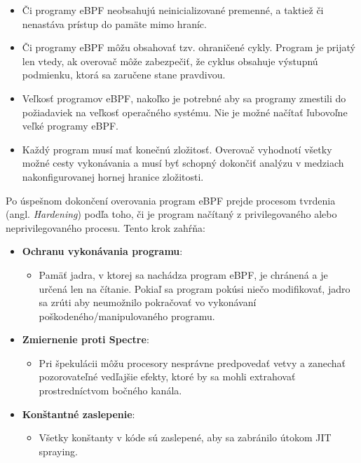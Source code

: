 \begin{itemize}
    \item Či programy eBPF neobsahujú neinicializované premenné, a taktiež či nenastáva prístup do pamäte mimo hraníc.
    \item Či programy eBPF môžu obsahovať tzv. ohraničené cykly. Program je prijatý len vtedy, ak overovač môže zabezpečiť, 
    že cyklus obsahuje výstupnú podmienku, ktorá sa zaručene stane pravdivou.
    \item Veľkosť programov eBPF, nakoľko je potrebné aby sa programy zmestili do požiadaviek na veľkosť operačného systému. 
    Nie je možné načítať ľubovoľne veľké programy eBPF.
    \item Každý program musí mať konečnú zložitosť. Overovač vyhodnotí všetky možné cesty vykonávania a musí byť schopný dokončiť analýzu 
    v medziach nakonfigurovanej hornej hranice zložitosti.
\end{itemize}

Po úspešnom dokončení overovania program eBPF prejde procesom tvrdenia (angl. \emph{Hardening}) podľa toho, či je program načítaný z 
privilegovaného alebo neprivilegovaného procesu. 
Tento krok zahŕňa:
\begin{itemize}
    \item \textbf{Ochranu vykonávania programu}: 
        \begin{itemize}
            \item Pamäť jadra, v ktorej sa nachádza program eBPF, je chránená a je určená len na čítanie. 
            Pokiaľ sa program pokúsi niečo modifikovať, jadro sa zrúti aby neumožnilo pokračovať vo vykonávaní poškodeného/manipulovaného programu.
        \end{itemize}
    \item \textbf{Zmiernenie proti Spectre}: 
        \begin{itemize}
            \item Pri špekulácii môžu procesory nesprávne predpovedať vetvy a zanechať pozorovateľné vedľajšie efekty, 
            ktoré by sa mohli extrahovať prostredníctvom bočného kanála.
        \end{itemize}
    \item \textbf{Konštantné zaslepenie}: 
        \begin{itemize}
            \item Všetky konštanty v kóde sú zaslepené, aby sa zabránilo útokom JIT spraying.
        \end{itemize}
\end{itemize}

